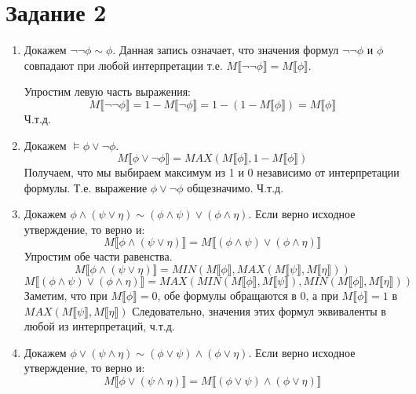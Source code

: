 \documentclass{article}
\begin{document}
\section*{Задание 2}
\begin{enumerate}
    \item
        Докажем \(\neg \neg \phi \sim \phi\). Данная запись означает, 
        что значения формул \(\neg \neg \phi\) и \(\phi\) совпадают при любой интерпретации 
        т.е. \(M\llbracket \neg \neg \phi\rrbracket = M\llbracket\phi\rrbracket\).

        Упростим левую часть выражения:
        \[
            M\llbracket\neg \neg \phi \rrbracket
            = 1 - M\llbracket \neg \phi \rrbracket
            = 1 - (1 - M\llbracket\phi\rrbracket)
            = M\llbracket\phi\rrbracket
        \]
        Ч.т.д.
    \item
        Докажем \(\models \phi \lor \neg \phi\).
        \[
            M\llbracket \phi \lor \neg \phi \rrbracket
            = MAX(M\llbracket \phi \rrbracket, 1 - M\llbracket \phi \rrbracket)
        \]
        Получаем, что мы выбираем максимум из 1 и 0 независимо от интерпретации формулы. 
        Т.е. выражение \(\phi \lor \neg \phi\) общезначимо. Ч.т.д.
    \item
        Докажем \(\phi \land (\psi \lor \eta) \sim (\phi \land \psi) \lor (\phi \land \eta)\).
        Если верно исходное утверждение, то верно и:
        \[M \llbracket \phi \land (\psi \lor \eta) \rrbracket = M \llbracket (\phi \land \psi) \lor (\phi \land \eta) \rrbracket\]
        Упростим обе части равенства.
        \[
            M \llbracket \phi \land (\psi \lor \eta) \rrbracket 
            = MIN(M \llbracket \phi \rrbracket, MAX(M \llbracket \psi \rrbracket, M \llbracket \eta \rrbracket))
        \]
        \[
            M \llbracket (\phi \land \psi) \lor (\phi \land \eta) \rrbracket
            = MAX(MIN(M \llbracket \phi \rrbracket, M \llbracket \psi \rrbracket), MIN(M \llbracket \phi \rrbracket, M \llbracket \eta \rrbracket))
        \]
        Заметим, что при \(M \llbracket \phi \rrbracket = 0\), обе формулы обращаются в 0, 
        а при \(M \llbracket \phi \rrbracket = 1\) в \(MAX(M \llbracket \psi \rrbracket, M \llbracket \eta \rrbracket)\)
        Следовательно, значения этих формул эквиваленты в любой из интерпретаций, ч.т.д.
    \item 
        Докажем \(\phi \lor (\psi \land \eta) \sim (\phi \lor \psi) \land (\phi \lor \eta)\).
        Если верно исходное утверждение, то верно и:
        \[M \llbracket \phi \lor (\psi \land \eta) \rrbracket = M \llbracket (\phi \lor \psi) \land (\phi \lor \eta) \rrbracket\]

\end{enumerate}
\end{document}
